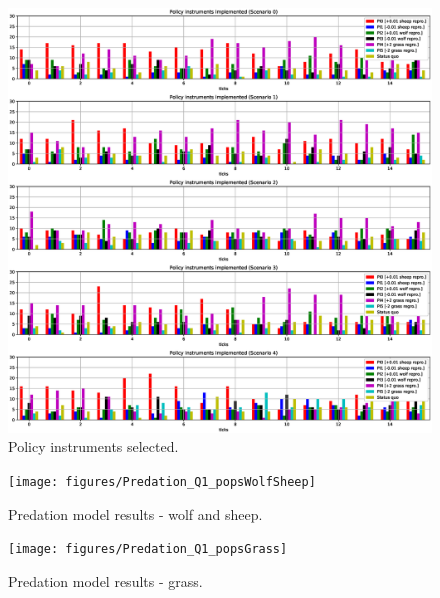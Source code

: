 \documentclass[12pt]{article}
\begin{document}
\begin{figure}
\centering
\includegraphics[width = 0.95\linewidth, angle = 0]{figures/PE_PI_selection}
\caption{Policy instruments selected.}
\label{fig:PE_PI_selection}
\end{figure}

\begin{figure}
\centering
\texttt{[image: figures/Predation\_Q1\_popsWolfSheep]}
\caption{Predation model results - wolf and sheep.}
\label{fig:Predation_Q1_popsWolfSheep}
\end{figure}

\begin{figure}
\centering
\texttt{[image: figures/Predation\_Q1\_popsGrass]}
\caption{Predation model results - grass.}
\label{fig:Predation_Q1_popsGrass}
\end{figure}



 

\end{document}
